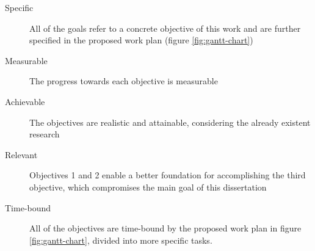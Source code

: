 \begin{description}
	\item[Specific] All of the goals refer to a concrete objective of this work and are further specified in the proposed work plan (figure \ref{fig:gantt-chart})
	\item[Measurable] The progress towards each objective is measurable
	\item[Achievable] The objectives are realistic and attainable, considering the already existent research
	\item[Relevant] Objectives 1 and 2 enable a better foundation for accomplishing the third objective, which compromises the main goal of this dissertation
	\item[Time-bound] All of the objectives are time-bound by the proposed work plan in figure \ref{fig:gantt-chart}, divided into more specific tasks.
\end{description}

